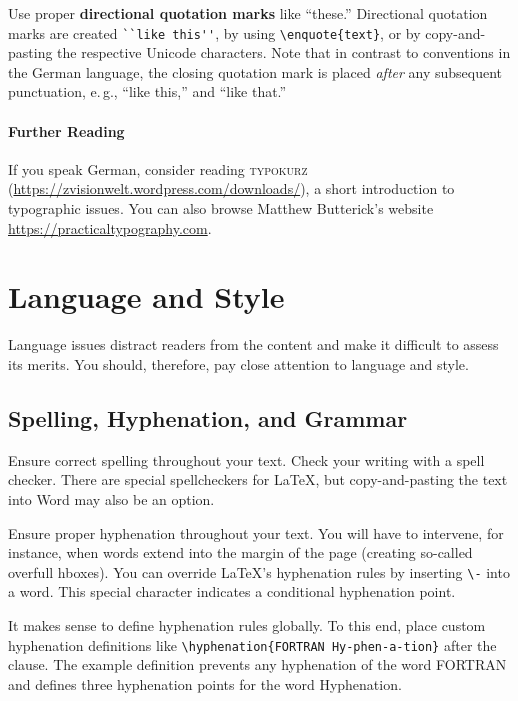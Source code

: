Use proper \textbf{directional quotation marks} like ``these.'' Directional quotation marks are created  \verb|``like this''|, by using \verb|\enquote{text}|, or by copy-and-pasting the respective Unicode characters. Note that in contrast to conventions in the German language, the closing quotation mark is placed \emph{after} any subsequent punctuation, e.\,g., ``like this,'' and ``like that.''

\paragraph{Further Reading}

If you speak German, consider reading \textsc{typokurz} (\url{https://zvisionwelt.wordpress.com/downloads/}), a short introduction to typographic issues. You can also browse Matthew Butterick's website \url{https://practicaltypography.com}.

\section{Language and Style}

Language issues distract readers from the content and make it difficult to assess its merits. You should, therefore, pay close attention to language and style.

\subsection{Spelling, Hyphenation, and Grammar}

Ensure correct spelling throughout your text. Check your writing with a spell checker. There are special spellcheckers for LaTeX, but copy-and-pasting the text into Word may also be an option.

Ensure proper hyphenation throughout your text. You will have to intervene, for instance, when words extend into the margin of the page (creating so-called overfull hboxes). You can override LaTeX's hyphenation rules by inserting \verb|\-| into a word. This special character indicates a conditional hyphenation point.

It makes sense to define hyphenation rules globally. To this end, place custom hyphenation definitions like \verb|\hyphenation{FORTRAN Hy-phen-a-tion}| after the \verb|| clause.
The example definition prevents any hyphenation of the word FORTRAN and defines three hyphenation points for the word Hyphenation.

